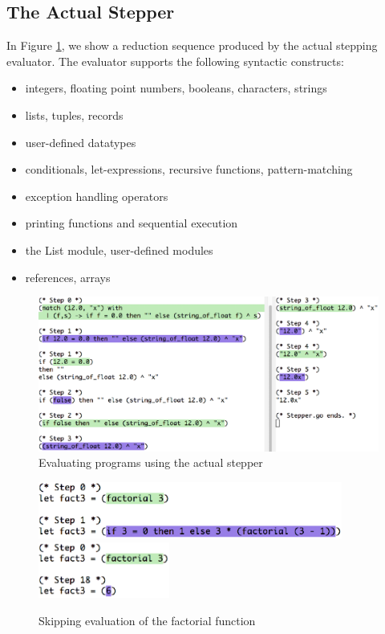 \subsection{The Actual Stepper}
\label{sec:imp:ocaml}

In Figure \ref{figure:ocamlstep}, we show a reduction sequence produced by the actual stepping evaluator.  The evaluator supports the following syntactic constructs:

\begin{itemize}
\item integers, floating point numbers, booleans, characters, strings
\item lists, tuples, records
\item user-defined datatypes
\item conditionals, let-expressions, recursive functions, pattern-matching
\item exception handling operators
\item printing functions and sequential execution
\item the List module, user-defined modules
\item references, arrays
\end{itemize}


\begin{figure}
  \includegraphics[width=14cm]{3/longexample.eps}
  \caption{Evaluating programs using the actual stepper}
  \label{figure:ocamlstep}
\end{figure}

\begin{figure}
  \includegraphics[width=10cm]{3/beforeskip.eps}
  \includegraphics[width=4.3cm]{3/afterskip.eps}
  \caption{Skipping evaluation of the factorial function}
  \label{figure:factskip}
\end{figure}

